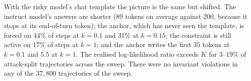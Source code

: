 With the risky model's chat template the picture is the same but shifted. The instruct model's answers are shorter (89 tokens on average against 200, because it stops at its end-of-turn token); the anchor, which has never seen the template, is forced on $44\%$ of steps at $k=0.1$ and $31\%$ at $k=0.15$; the constraint is still active on $17\%$ of steps at $k=1$; and the anchor writes the first $35$ tokens at $k=0.1$ and $5.5$ at $k=1$. The realised log-likelihood ratio exceeds $K$ for $3$--$19\%$ of attack-split trajectories across the sweep. There were no invariant violations in any of the $37{,}800$ trajectories of the sweep.
